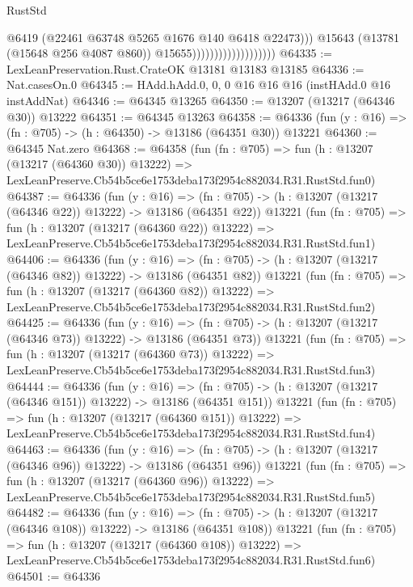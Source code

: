 \begin{lexlean}{RustStd}
\begin{coremodule}
                                              @6419
                                              (@22461 @63748 @5265 @1676 @140 @6418 @22473)))
                                          @15643
                                          (@13781 (@15648 @256 @4087 @860))
                                          @15655)))))))))))))))))))
@64335 := LexLeanPreservation.Rust.CrateOK @13181 @13183 @13185
@64336 := Nat.casesOn.{0}
@64345 := HAdd.hAdd.{0, 0, 0} @16 @16 @16 (instHAdd.{0} @16 instAddNat)
@64346 := @64345 @13265
@64350 := @13207 (@13217 (@64346 @30)) @13222
@64351 := @64345 @13263
@64358 := @64336 (fun (y : @16) => (fn : @705) -> (h : @64350) -> @13186 (@64351 @30)) @13221
@64360 := @64345 Nat.zero
@64368 := @64358
    (fun (fn : @705) =>
    fun (h : @13207 (@13217 (@64360 @30)) @13222) =>
    LexLeanPreserve.Cb54b5ce6e1753deba173f2954c882034.R31.RustStd.fun0)
@64387 := @64336
    (fun (y : @16) =>
    (fn : @705) -> (h : @13207 (@13217 (@64346 @22)) @13222) -> @13186 (@64351 @22))
    @13221
    (fun (fn : @705) =>
    fun (h : @13207 (@13217 (@64360 @22)) @13222) =>
    LexLeanPreserve.Cb54b5ce6e1753deba173f2954c882034.R31.RustStd.fun1)
@64406 := @64336
    (fun (y : @16) =>
    (fn : @705) -> (h : @13207 (@13217 (@64346 @82)) @13222) -> @13186 (@64351 @82))
    @13221
    (fun (fn : @705) =>
    fun (h : @13207 (@13217 (@64360 @82)) @13222) =>
    LexLeanPreserve.Cb54b5ce6e1753deba173f2954c882034.R31.RustStd.fun2)
@64425 := @64336
    (fun (y : @16) =>
    (fn : @705) -> (h : @13207 (@13217 (@64346 @73)) @13222) -> @13186 (@64351 @73))
    @13221
    (fun (fn : @705) =>
    fun (h : @13207 (@13217 (@64360 @73)) @13222) =>
    LexLeanPreserve.Cb54b5ce6e1753deba173f2954c882034.R31.RustStd.fun3)
@64444 := @64336
    (fun (y : @16) =>
    (fn : @705) -> (h : @13207 (@13217 (@64346 @151)) @13222) -> @13186 (@64351 @151))
    @13221
    (fun (fn : @705) =>
    fun (h : @13207 (@13217 (@64360 @151)) @13222) =>
    LexLeanPreserve.Cb54b5ce6e1753deba173f2954c882034.R31.RustStd.fun4)
@64463 := @64336
    (fun (y : @16) =>
    (fn : @705) -> (h : @13207 (@13217 (@64346 @96)) @13222) -> @13186 (@64351 @96))
    @13221
    (fun (fn : @705) =>
    fun (h : @13207 (@13217 (@64360 @96)) @13222) =>
    LexLeanPreserve.Cb54b5ce6e1753deba173f2954c882034.R31.RustStd.fun5)
@64482 := @64336
    (fun (y : @16) =>
    (fn : @705) -> (h : @13207 (@13217 (@64346 @108)) @13222) -> @13186 (@64351 @108))
    @13221
    (fun (fn : @705) =>
    fun (h : @13207 (@13217 (@64360 @108)) @13222) =>
    LexLeanPreserve.Cb54b5ce6e1753deba173f2954c882034.R31.RustStd.fun6)
@64501 := @64336

\end{coremodule}
\end{lexlean}
